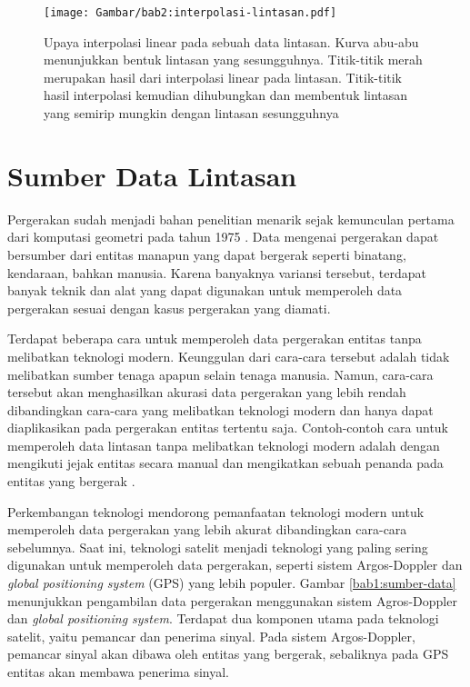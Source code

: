 \begin{figure}[h]
    \centering
    \texttt{[image: Gambar/bab2:interpolasi-lintasan.pdf]}
    \caption[Interpolasi lintasan]{Upaya interpolasi linear pada sebuah data lintasan. Kurva abu-abu menunjukkan bentuk lintasan yang sesungguhnya. Titik-titik merah merupakan hasil dari interpolasi linear pada lintasan. Titik-titik hasil interpolasi kemudian dihubungkan dan membentuk lintasan yang semirip mungkin dengan lintasan sesungguhnya}
    \label{bab2:interpolasi-lintasan}
\end{figure}

\section{Sumber Data Lintasan}
\label{sec:sumber}

Pergerakan sudah menjadi bahan penelitian menarik sejak kemunculan pertama dari komputasi geometri pada tahun 1975 \cite{shamos:02:computational-geometry}. Data mengenai pergerakan dapat bersumber dari entitas manapun yang dapat bergerak seperti binatang, kendaraan, bahkan manusia. Karena banyaknya variansi tersebut, terdapat banyak teknik dan alat yang dapat digunakan untuk memperoleh data pergerakan sesuai dengan kasus pergerakan yang diamati.

Terdapat beberapa cara untuk memperoleh data pergerakan entitas tanpa melibatkan teknologi modern. Keunggulan dari cara-cara tersebut adalah tidak melibatkan sumber tenaga apapun selain tenaga manusia. Namun, cara-cara tersebut akan menghasilkan akurasi data pergerakan yang lebih rendah dibandingkan cara-cara yang melibatkan teknologi modern dan hanya dapat diaplikasikan pada pergerakan entitas tertentu saja. Contoh-contoh cara untuk memperoleh data lintasan tanpa melibatkan teknologi modern adalah dengan mengikuti jejak entitas secara manual \cite{stickel:02:turtle} dan mengikatkan sebuah penanda pada entitas yang bergerak \cite{velden:02:cranes}.

Perkembangan teknologi mendorong pemanfaatan teknologi modern untuk memperoleh data pergerakan yang lebih akurat dibandingkan cara-cara sebelumnya. Saat ini, teknologi satelit menjadi teknologi yang paling sering digunakan untuk memperoleh data pergerakan, seperti sistem Argos-Doppler dan \textit{global positioning system} (GPS) yang lebih populer. Gambar \ref{bab1:sumber-data} menunjukkan pengambilan data pergerakan menggunakan sistem Agros-Doppler dan \textit{global positioning system}. Terdapat dua komponen utama pada teknologi satelit, yaitu pemancar dan penerima sinyal. Pada sistem Argos-Doppler, pemancar sinyal akan dibawa oleh entitas yang bergerak, sebaliknya pada GPS entitas akan membawa penerima sinyal.

